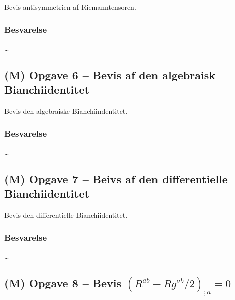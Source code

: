 \documentclass[../main.tex]{subfiles}
\begin{document}
Bevis antisymmetrien af Riemanntensoren.


\subsubsection{Besvarelse}

\ldots




\subsection{(M) Opgave 6 -- Bevis af den algebraisk Bianchiidentitet}
\setcounter{subsection}{6}
\setcounter{equation}{0}

Bevis den algebraiske Bianchiindentitet.


\subsubsection{Besvarelse}

\ldots




\subsection{(M) Opgave 7 -- Beivs af den differentielle Bianchiidentitet}
\setcounter{subsection}{7}
\setcounter{equation}{0}

Bevis den differentielle Bianchiidentitet.


\subsubsection{Besvarelse}

\ldots




\subsection{(M) Opgave 8 -- Bevis $(R^{ab} - Rg^{ab}/2)_{;a} = 0$}
\setcounter{subsection}{8}
\setcounter{equation}{0}
\end{document}
